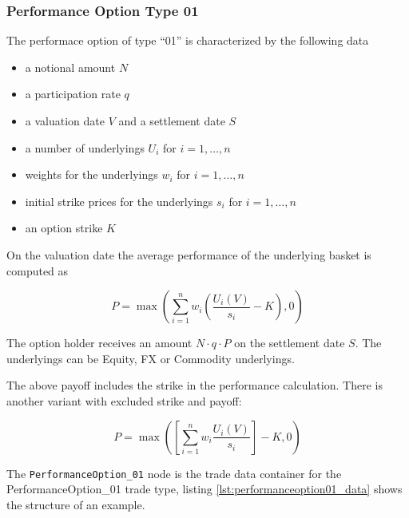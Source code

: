 \subsubsection{Performance Option Type 01}

The performace option of type ``01'' is characterized by the following data

\begin{itemize}
\item a notional amount $N$
\item a participation rate $q$
\item a valuation date $V$ and a settlement date $S$
\item a number of underlyings $U_i$ for $i=1,\ldots,n$
\item weights for the underlyings $w_i$ for $i=1,\ldots,n$
\item initial strike prices for the underlyings $s_i$ for $i=1,\ldots,n$
\item an option strike $K$
\end{itemize}

On the valuation date the average performance of the underlying basket is computed as

$$
P = \max\left( \sum_{i=1}^n w_i \left( \frac{U_i(V)}{s_i} - K \right), 0 \right)
$$

The option holder receives an amount $N\cdot q\cdot P$ on the settlement date $S$. The underlyings can be Equity, FX or
Commodity underlyings.

The above payoff includes the strike in the performance calculation. There is another variant with excluded strike and payoff:

$$
P = \max\left( \left[ \sum_{i=1}^n w_i \frac{U_i(V)}{s_i} \right] - K, 0 \right)
$$

The \verb+PerformanceOption_01+ node is the trade data container for the PerformanceOption\_01 trade type, listing
\ref{lst:performanceoption01_data} shows the structure of an example.

